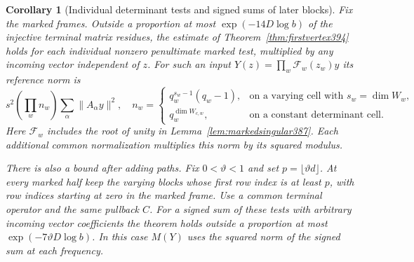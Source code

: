 \documentclass[a4paper,11pt]{article}
\newtheorem{corollary}[proposition]{Corollary}
\theoremstyle{definition}
\theoremstyle{remark}
\numberwithin{equation}{section}
\begin{document}
\begin{corollary}[Individual determinant tests and signed sums of later blocks]
\label{cor:markedpaths394}
Fix the marked frames. Outside a proportion at most
\(\exp(-14D\log b)\) of the injective terminal matrix residues,
the estimate of Theorem~\ref{thm:firstvertex394} holds for each
individual nonzero penultimate marked test, multiplied by any
incoming vector independent of \(z\). For such an input
\(Y(z)=\prod_w\mathcal F_w(z_w)y\) its reference norm is
\[
     s^2\left(\prod_w n_w\right)\sum_\alpha\|A_\alpha y\|^2,
 \quad
 n_w=\begin{cases}
       q_w^{s_w-1}(q_w-1),&\text{on a varying cell with }
                                    s_w=\dim W_w,\\
       q_w^{\dim W_{c,w}},&\text{on a constant determinant cell}.
     \end{cases}
\]
Here \(\mathcal F_w\) includes the root of unity in
Lemma~\ref{lem:markedsingular387}. Each additional common
normalization multiplies this norm by its squared modulus.

There is also a bound after adding paths. Fix \(0<\vartheta<1\)
and set \(p=\lfloor\vartheta d\rfloor\). At every marked
half keep the varying blocks whose first row index is at least
\(p\), with row indices starting at zero in the marked frame.
Use a common terminal operator and the same pullback \(C\).
For a signed sum of these tests with arbitrary incoming vector
coefficients the theorem holds outside a proportion at most
\(\exp(-7\vartheta D\log b)\). In this case \(M(Y)\)
uses the squared norm of the signed sum at each frequency.
\end{corollary}
\end{document}
